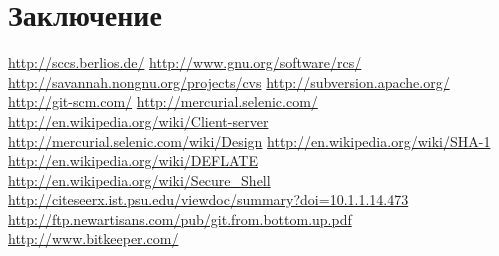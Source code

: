 \documentclass[a4paper]{article}
\begin{document}
\section{Заключение}

\newpage

\begin{thebibliography}{99}
   \url{http://sccs.berlios.de/}
   \url{http://www.gnu.org/software/rcs/}
   \url{http://savannah.nongnu.org/projects/cvs}
   \url{http://subversion.apache.org/}
   \url{http://git-scm.com/}
   \url{http://mercurial.selenic.com/}
   \url{http://en.wikipedia.org/wiki/Client-server}
   \url{http://mercurial.selenic.com/wiki/Design}
   \url{http://en.wikipedia.org/wiki/SHA-1}
   \url{http://en.wikipedia.org/wiki/DEFLATE}
   \url{http://en.wikipedia.org/wiki/Secure\_Shell}
   \url{http://citeseerx.ist.psu.edu/viewdoc/summary?doi=10.1.1.14.473}
   \url{http://ftp.newartisans.com/pub/git.from.bottom.up.pdf}
   \url{http://www.bitkeeper.com/}
\end{thebibliography}
\end{document}
